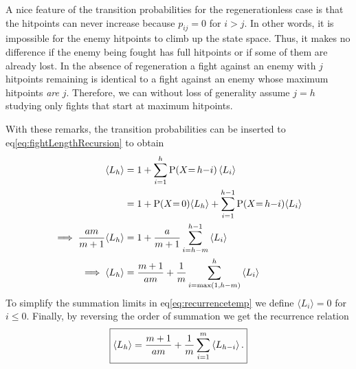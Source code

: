 A nice feature of the transition probabilities for the regenerationless case is that the hitpoints can never increase because $p_{ij} = 0$ for $i > j$. In other words, it is impossible for the enemy hitpoints to climb up the state space. Thus, it makes no difference if the enemy being fought has full hitpoints or if some of them are already lost. In the absence of regeneration a fight against an enemy with $j$ hitpoints remaining is identical to a fight against an enemy whose maximum hitpoints \emph{are} $j$. Therefore, we can without loss of generality assume $j=h$ studying only fights that start at maximum hitpoints.

With these remarks, the transition probabilities can be inserted to eq\ref{eq:fightLengthRecursion} to obtain
\begin{align}
	\E{L_h}
		&= 1 + \sum_{i=1}^h \Pr{X=\,h-i}\E{L_i}\nonumber\\
		&= 1 + \Pr{X=\,0}\langle L_h \rangle + \sum_{i=1}^{h-1} \Pr{X=\,h-i}\langle L_i \rangle\nonumber\\
	\implies \frac{am}{m+1}\langle L_h \rangle
		&= 1 + \frac{a}{m+1}\sum_{i=h-m}^{h-1} \E{L_i}\nonumber\\
	\implies \langle L_h \rangle
		&= \frac{m+1}{am} + \frac{1}{m}\sum_{i=\max(1,h-m)}^h \E{L_i}\label{eq:recurrencetemp}
\end{align}
To simplify the summation limits in eq\ref{eq:recurrencetemp} we define $\langle L_i \rangle = 0$ for $i \leq 0$. Finally, by reversing the order of summation we get the recurrence relation
\begin{align}
	\boxed{\left\langle L_h \right\rangle
		= \frac{m+1}{am} + \frac{1}{m}\sum_{i=1}^m \left\langle L_{h-i} \right\rangle.
	}\label{eq:noregenRecursion}
\end{align}
